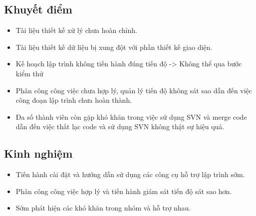 \documentclass{article}
\begin{document}
		\subsection{Khuyết điểm}
			\begin{itemize}
				\item Tài liệu thiết kế xử lý chưa hoàn chỉnh.
				\item Tài liệu thiết kế dữ liệu bị xung đột với phần thiết kế giao diện.
				\item Kế hoạch lập trình không tiến hành đúng tiến độ -> Không thể qua bước kiểm thử
				\item Phân công công việc chưa hợp lý, quản lý tiến độ không sát sao dẫn đến việc công đoạn lập trình chưa hoàn thành.
				\item Đa số thành viên còn gặp khó khăn trong việc sử dụng SVN và merge code dẫn đến việc thất lạc code và sử dụng SVN không thật sự hiệu quả.
			\end{itemize}
		\subsection{Kinh nghiệm}
		
			\begin{itemize}
				\item Tiến hành cài đặt và hướng dẫn sử dụng các công cụ hỗ trợ lập trình sớm.
				\item Phân công công việc hợp lý và tiến hành giám sát tiến độ sát sao hơn.
				\item Sớm phát hiện các khó khăn trong nhóm và hỗ trợ nhau.
			\end{itemize}
		
\end{document}
